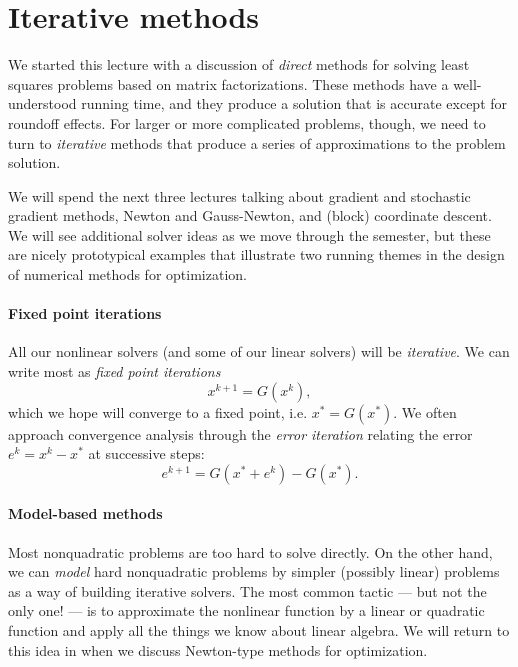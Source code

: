 \documentclass[12pt, leqno]{article} %
\begin{document}





\section{Iterative methods}

We started this lecture with a discussion of {\em direct} methods
for solving least squares problems based on matrix factorizations.
These methods have a well-understood running time, and they produce
a solution that is accurate except for roundoff effects.  For larger
or more complicated problems, though, we need to turn to
{\em iterative} methods that produce a series of approximations
to the problem solution.

We will spend the next three lectures talking about gradient and
stochastic gradient methods, Newton and Gauss-Newton, and (block)
coordinate descent.  We will see additional solver ideas as we move
through the semester, but these are nicely prototypical examples that
illustrate two running themes in the design of numerical methods for
optimization.

\paragraph{Fixed point iterations}
All our nonlinear solvers (and some of our linear solvers) will be
{\em iterative}.  We can write most as {\em fixed point iterations}
\begin{equation}
  x^{k+1} = G(x^k), \label{eq:fixed-point}
\end{equation}
which we hope will converge to a fixed point, i.e. $x^* = G(x^*)$.
We often approach convergence analysis through the
{\em error iteration} relating the error $e^k = x^k-x^*$ at
successive steps:
\begin{equation}
  e^{k+1} = G(x^* + e^k)-G(x^*).
\end{equation}

\paragraph{Model-based methods}
Most nonquadratic problems are too hard to solve directly.  On the other
hand, we can {\em model} hard nonquadratic problems by simpler (possibly
linear) problems as a way of building iterative solvers.  The most
common tactic --- but not the only one! --- is to approximate the
nonlinear function by a linear or quadratic function and apply all the
things we know about linear algebra.  We will return to this idea in
when we discuss Newton-type methods for optimization.
\end{document}
